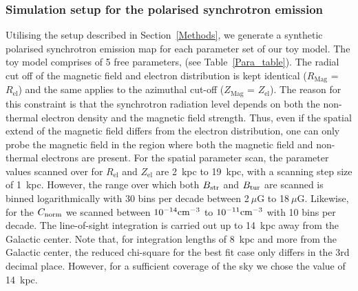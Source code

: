 \documentclass[usenatbib]{mnras}
\begin{document}
\subsubsection{Simulation setup for the polarised synchrotron emission}
Utilising the setup described in Section~\ref{Methods}, we generate a synthetic polarised synchrotron emission map for each parameter set of our toy model. The toy model comprises of 5 free parameters, (see Table~\ref{Para_table}). The radial cut off of the magnetic field and electron distribution is kept identical ($R_{\mathrm{Mag}}$ = $R_{\mathrm{el}}$) and the same applies to the azimuthal cut-off ($Z_{\mathrm{Mag}}$ = $Z_{\mathrm{el}}$). The reason for this constraint is that the synchrotron radiation level depends on both the non-thermal electron density and the magnetic field strength. Thus, even if the spatial extend of the magnetic field differs from the electron distribution, one can only probe the magnetic field in the region where both the magnetic field and non-thermal electrons are present. 
For the spatial parameter scan, the parameter values scanned over for $R_{\mathrm{el}}$ and $Z_{\mathrm{el}}$ are 2~kpc to 19~kpc, with a scanning step size of 1~kpc. 
However, the range over which both $B_{\rm str}$ and $B_{\rm tur}$ are scanned is binned logarithmically with 30 bins per decade between 2$~\mu$G to 18$~\mu$G. Likewise, for the $C_{\rm norm}$ we scanned between $10^{-14} \rm cm^{-3}$ to $10^{-11} \rm cm^{-3}$ with 10 bins per decade. The line-of-sight integration is carried out up to 14~kpc away from the Galactic center. Note that, for integration lengths of 8~kpc and more from the Galactic center, the reduced chi-square for the best fit case only differs in the 3rd decimal place. However, for a sufficient coverage of the sky we chose the value of 14~kpc.

\end{document}
